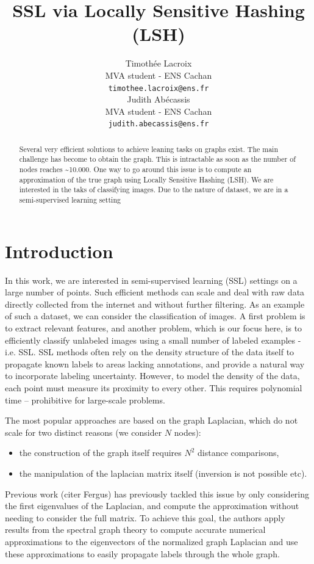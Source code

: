 \documentclass{article} %
\title{SSL via Locally Sensitive Hashing (LSH)}
\author{
Timothée Lacroix \\
MVA student - ENS Cachan\\
\texttt{timothee.lacroix@ens.fr} \\
\And
Judith Abécassis \\
MVA student - ENS Cachan \\
\texttt{judith.abecassis@ens.fr} \\
}
\begin{document}
\maketitle

\begin{abstract}
Several very efficient solutions to achieve leaning tasks on graphs exist. The main challenge has become to obtain the graph. This is intractable as soon as the number of nodes reaches \textasciitilde 10.000. One way to go around this issue is to compute an approximation of the true graph using Locally Sensitive Hashing (LSH). We are interested in the taks of classifying images. Due to the nature of dataset, we are in a semi-supervised learning setting 
\end{abstract}


\section{Introduction}
In this work, we are interested in semi-supervised learning (SSL) settings on a large number of points. Such efficient methods can scale and deal with raw data directly collected from the internet and without further filtering. As an example of such a dataset, we can consider the classification of images. A first problem is to extract relevant features, and another problem, which is our focus here, is to efficiently classify unlabeled images using a small number of labeled examples - i.e. SSL. SSL methods often rely on the density structure of the data itself to propagate known labels to areas lacking annotations, and provide a natural way to incorporate labeling uncertainty. However, to model the density of the data, each point must measure its proximity to every other. This requires polynomial time – prohibitive for large-scale problems. 

 The most popular approaches are based on the graph Laplacian, which do not scale for two distinct reasons (we consider $N$ nodes):
\begin{itemize}
\item the construction of the graph itself requires $N^2$ distance comparisons,
\item the manipulation of the laplacian matrix itself (inversion is not possible etc).
\end{itemize}

Previous work (citer Fergus) has previously tackled this issue by only considering the first eigenvalues of the Laplacian, and compute the approximation without needing to consider the full matrix. To achieve this goal, the authors apply results from the spectral graph theory to compute accurate numerical approximations to the eigenvectors of the normalized
graph Laplacian and use these approximations to easily propagate labels through the whole graph. 
\end{document}
